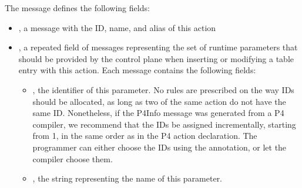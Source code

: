 \documentclass[11pt]{article}
\begin{document}
{%
The  message defines the following fields:%

\begin{itemize}%

\item{}
, a  message with the ID, name, and alias of this action%

\item{}
, a repeated field of  messages representing the set of runtime
parameters that should be provided by the control plane when inserting or
modifying a table entry with this action. Each  message contains the
following fields:%

\begin{itemize}[noitemsep,topsep=\mdcompacttopsep]%

\item{}, the  identifier of this parameter. No rules are prescribed
on the way  IDs should be allocated, as long as two  of the
same action do not have the same ID. Nonetheless, if the P4Info message
was generated from a P4 compiler, we recommend that the IDs be assigned
incrementally, starting from 1, in the same order as in the P4 action
declaration. The programmer can either choose the IDs using the 
annotation, or let the compiler choose them.%

\item{}, the string representing the name of this parameter.%


\end{itemize}
\end{itemize}}
\end{document}
